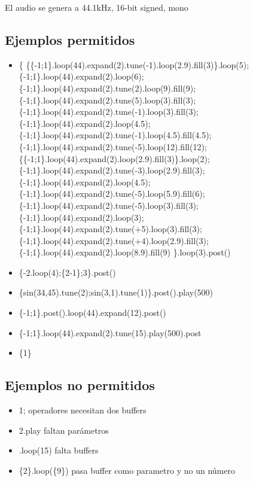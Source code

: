 \documentclass[a4paper,titlepage,10pt]{article}
\begin{document}
El audio se genera a 44.1kHz, 16-bit signed, mono

\subsection{Ejemplos permitidos}

\begin{itemize}
\item{\{ 
		     \{\{-1;1\}.loop(44).expand(2).tune(-1).loop(2.9).fill(3)\}.loop(5);                                                  
		     \{-1;1\}.loop(44).expand(2).loop(6);                            
		     \{-1;1\}.loop(44).expand(2).tune(2).loop(9).fill(9);            
		     \{-1;1\}.loop(44).expand(2).tune(5).loop(3).fill(3);           
		     \{-1;1\}.loop(44).expand(2).tune(-1).loop(3).fill(3);            
		     \{-1;1\}.loop(44).expand(2).loop(4.5);                           
		     \{-1;1\}.loop(44).expand(2).tune(-1).loop(4.5).fill(4.5);        
		     \{-1;1\}.loop(44).expand(2).tune(-5).loop(12).fill(12);          
		     \{\{-1;1\}.loop(44).expand(2).loop(2.9).fill(3)\}.loop(2);                                                
		     \{-1;1\}.loop(44).expand(2).tune(-3).loop(2.9).fill(3);         
		     \{-1;1\}.loop(44).expand(2).loop(4.5);                           
		     \{-1;1\}.loop(44).expand(2).tune(-5).loop(5.9).fill(6);         
		     \{-1;1\}.loop(44).expand(2).tune(-5).loop(3).fill(3);            
		     \{-1;1\}.loop(44).expand(2).loop(3);                            
		     \{-1;1\}.loop(44).expand(2).tune(+5).loop(3).fill(3);            
		     \{-1;1\}.loop(44).expand(2).tune(+4).loop(2.9).fill(3);         
		     \{-1;1\}.loop(44).expand(2).loop(8.9).fill(9)                  
		 \}.loop(3).post()}
\item{\{-2.loop(4);\{2-1\};3\}.post()}
\item{\{sin(34,45).tune(2);sin(3,1).tune(1)\}.post().play(500)}
\item{\{-1;1\}.post().loop(44).expand(12).post()}
\item{\{-1;1\}.loop(44).expand(2).tune(15).play(500).post}
\item{\{1\}}
\end{itemize}

\subsection{Ejemplos no permitidos}
\begin{itemize}
\item{1; operadores necesitan dos buffers}
\item{2.play faltan parámetros}
\item{.loop(15) falta buffers}
\item{\{2\}.loop(\{9\}) pasa buffer como parametro y no un número}
\end{itemize}
\end{document}
